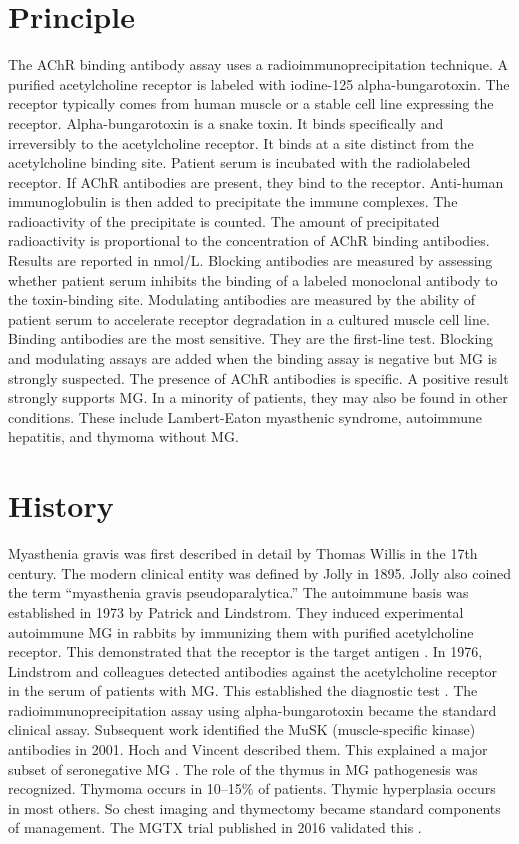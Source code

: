 \section*{Principle}
The AChR binding antibody assay uses a radioimmunoprecipitation technique. A purified acetylcholine receptor is labeled with iodine-125 alpha-bungarotoxin. The receptor typically comes from human muscle or a stable cell line expressing the receptor. Alpha-bungarotoxin is a snake toxin. It binds specifically and irreversibly to the acetylcholine receptor. It binds at a site distinct from the acetylcholine binding site. Patient serum is incubated with the radiolabeled receptor. If AChR antibodies are present, they bind to the receptor. Anti-human immunoglobulin is then added to precipitate the immune complexes. The radioactivity of the precipitate is counted. The amount of precipitated radioactivity is proportional to the concentration of AChR binding antibodies. Results are reported in nmol/L. Blocking antibodies are measured by assessing whether patient serum inhibits the binding of a labeled monoclonal antibody to the toxin-binding site. Modulating antibodies are measured by the ability of patient serum to accelerate receptor degradation in a cultured muscle cell line. Binding antibodies are the most sensitive. They are the first-line test. Blocking and modulating assays are added when the binding assay is negative but MG is strongly suspected. The presence of AChR antibodies is specific. A positive result strongly supports MG. In a minority of patients, they may also be found in other conditions. These include Lambert-Eaton myasthenic syndrome, autoimmune hepatitis, and thymoma without MG.

\section*{History}
Myasthenia gravis was first described in detail by Thomas Willis in the 17th century. The modern clinical entity was defined by Jolly in 1895. Jolly also coined the term ``myasthenia gravis pseudoparalytica.'' The autoimmune basis was established in 1973 by Patrick and Lindstrom. They induced experimental autoimmune MG in rabbits by immunizing them with purified acetylcholine receptor. This demonstrated that the receptor is the target antigen \cite{patrick1973autoimmune}. In 1976, Lindstrom and colleagues detected antibodies against the acetylcholine receptor in the serum of patients with MG. This established the diagnostic test \cite{lindstrom1976antibody}. The radioimmunoprecipitation assay using alpha-bungarotoxin became the standard clinical assay. Subsequent work identified the MuSK (muscle-specific kinase) antibodies in 2001. Hoch and Vincent described them. This explained a major subset of seronegative MG \cite{hoch2001autoantibodies}. The role of the thymus in MG pathogenesis was recognized. Thymoma occurs in 10--15\% of patients. Thymic hyperplasia occurs in most others. So chest imaging and thymectomy became standard components of management. The MGTX trial published in 2016 validated this \cite{wolfe2016randomized}.

